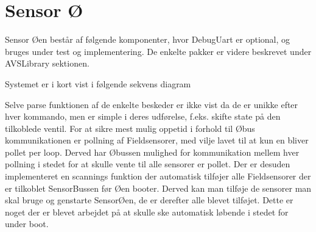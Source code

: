 \section{Sensor Ø}

Sensor Øen består af følgende komponenter, 
hvor DebugUart er optional, og bruges under 
test og implementering. De enkelte pakker er 
videre beskrevet under AVSLibrary sektionen.


Systemet er i kort vist i følgende sekvens diagram


Selve parse funktionen af de enkelte beskeder er ikke 
vist da de er unikke efter hver kommando, men er simple 
i deres udførelse, f.eks. skifte state på den tilkoblede 
ventil. For at sikre mest mulig oppetid i forhold til 
Øbus kommunikationen er pollning af Fieldsensorer, med 
vilje lavet til at kun en bliver pollet per loop. Derved 
har Øbussen mulighed for kommunikation mellem hver pollning 
i stedet for at skulle vente til alle sensorer er pollet. 
Der er desuden implementeret en scannings funktion der 
automatisk tilføjer alle Fieldsensorer der er tilkoblet 
SensorBussen før Øen booter. Derved kan man tilføje de 
sensorer man skal bruge og genstarte SensorØen, de er 
derefter alle blevet tilføjet. Dette er noget der er 
blevet arbejdet på at skulle ske automatisk løbende i 
stedet for under boot.